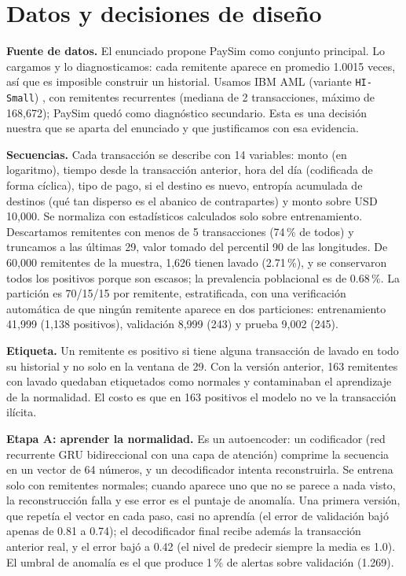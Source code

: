 \documentclass[11pt,a4paper]{article}
\begin{document}
\section{Datos y decisiones de diseño}
\textbf{Fuente de datos.} El enunciado propone PaySim como conjunto principal. Lo cargamos y lo diagnosticamos: cada remitente aparece en promedio 1.0015 veces, así que es imposible construir un historial. Usamos IBM AML (variante \texttt{HI-Small}) \cite{altman2023}, con remitentes recurrentes (mediana de 2 transacciones, máximo de 168,672); PaySim quedó como diagnóstico secundario. Esta es una decisión nuestra que se aparta del enunciado y que justificamos con esa evidencia.

\textbf{Secuencias.} Cada transacción se describe con 14 variables: monto (en logaritmo), tiempo desde la transacción anterior, hora del día (codificada de forma cíclica), tipo de pago, si el destino es nuevo, entropía acumulada de destinos (qué tan disperso es el abanico de contrapartes) y monto sobre USD 10,000. Se normaliza con estadísticos calculados solo sobre entrenamiento. Descartamos remitentes con menos de 5 transacciones (74\,\% de todos) y truncamos a las últimas 29, valor tomado del percentil 90 de las longitudes. De 60,000 remitentes de la muestra, 1,626 tienen lavado (2.71\,\%), y se conservaron todos los positivos porque son escasos; la prevalencia poblacional es de 0.68\,\%. La partición es 70/15/15 por remitente, estratificada, con una verificación automática de que ningún remitente aparece en dos particiones: entrenamiento 41,999 (1,138 positivos), validación 8,999 (243) y prueba 9,002 (245).

\textbf{Etiqueta.} Un remitente es positivo si tiene alguna transacción de lavado en todo su historial y no solo en la ventana de 29. Con la versión anterior, 163 remitentes con lavado quedaban etiquetados como normales y contaminaban el aprendizaje de la normalidad. El costo es que en 163 positivos el modelo no ve la transacción ilícita.

\textbf{Etapa A: aprender la normalidad.} Es un autoencoder: un codificador (red recurrente GRU bidireccional con una capa de atención) comprime la secuencia en un vector de 64 números, y un decodificador intenta reconstruirla. Se entrena solo con remitentes normales; cuando aparece uno que no se parece a nada visto, la reconstrucción falla y ese error es el puntaje de anomalía. Una primera versión, que repetía el vector en cada paso, casi no aprendía (el error de validación bajó apenas de 0.81 a 0.74); el decodificador final recibe además la transacción anterior real, y el error bajó a 0.42 (el nivel de predecir siempre la media es 1.0). El umbral de anomalía es el que produce 1\,\% de alertas sobre validación (1.269).
\end{document}
